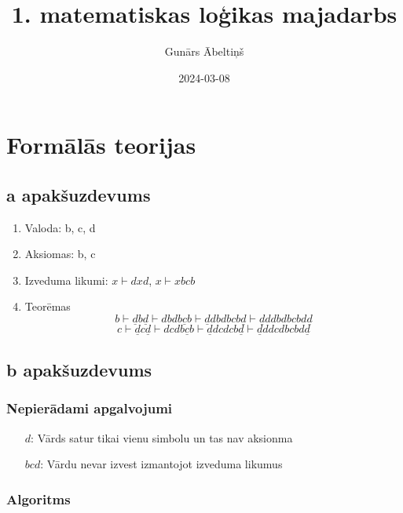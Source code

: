 \documentclass{article}
\title{1. matematiskas loģikas majadarbs}
\author{Gunārs Ābeltiņš}
\date{2024-03-08}
\begin{document}
\maketitle

\section{Formālās teorijas}

\subsection*{a apakšuzdevums}

\begin{enumerate}
    \item Valoda: {b, c, d}
    \item Aksiomas: b, c
    \item Izveduma likumi: $x \vdash dxd$, $x \vdash xbcb$
    \item Teorēmas
          \[
              b \vdash \underline{d}b\underline{d} \vdash dbd\underline{bcb} \vdash \underline{d}dbdbcb\underline{d} \vdash \underline{d}ddbdbcbd\underline{d}
          \]
          \[
              c \vdash \underline{d}c\underline{d} \vdash dcd\underline{bcb} \vdash \underline{d}dcdcb\underline{d} \vdash \underline{d}ddcdbcbd\underline{d}
          \]
\end{enumerate}

\subsection*{b apakšuzdevums}

\subsubsection*{Nepierādami apgalvojumi}

\begin{enumerate}
    \item[$d$:] Vārds satur tikai vienu simbolu un tas nav aksionma
    \item[$bcd$:] Vārdu nevar izvest izmantojot izveduma likumus
\end{enumerate}

\subsubsection*{Algoritms}
\end{document}
